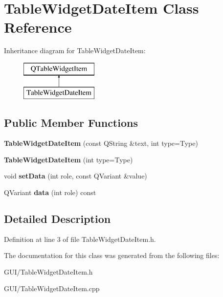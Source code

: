 \hypertarget{class_table_widget_date_item}{}\section{Table\+Widget\+Date\+Item Class Reference}
\label{class_table_widget_date_item}
Inheritance diagram for Table\+Widget\+Date\+Item\+:\begin{figure}[H]
\begin{center}
\leavevmode
\includegraphics[height=2.000000cm]{class_table_widget_date_item}
\end{center}
\end{figure}
\subsection*{Public Member Functions}
\begin{DoxyCompactItemize}
\item 
\mbox{\label{class_table_widget_date_item_a3374bf2e40dba88c742a7f1590ef8753}} 
{\bfseries Table\+Widget\+Date\+Item} (const Q\+String \&text, int type=Type)
\item 
\mbox{\label{class_table_widget_date_item_a41dccb5eba714dc210e0e0c54018a7b6}} 
{\bfseries Table\+Widget\+Date\+Item} (int type=Type)
\item 
\mbox{\label{class_table_widget_date_item_a0f918e431cdb5573fcbdc6d654c471c0}} 
void {\bfseries set\+Data} (int role, const Q\+Variant \&value)
\item 
\mbox{\label{class_table_widget_date_item_a549a4bf740624fa6926b6730c0132a4d}} 
Q\+Variant {\bfseries data} (int role) const
\end{DoxyCompactItemize}


\subsection{Detailed Description}


Definition at line 3 of file Table\+Widget\+Date\+Item.\+h.



The documentation for this class was generated from the following files\+:\begin{DoxyCompactItemize}
\item 
G\+U\+I/Table\+Widget\+Date\+Item.\+h\item 
G\+U\+I/Table\+Widget\+Date\+Item.\+cpp\end{DoxyCompactItemize}
